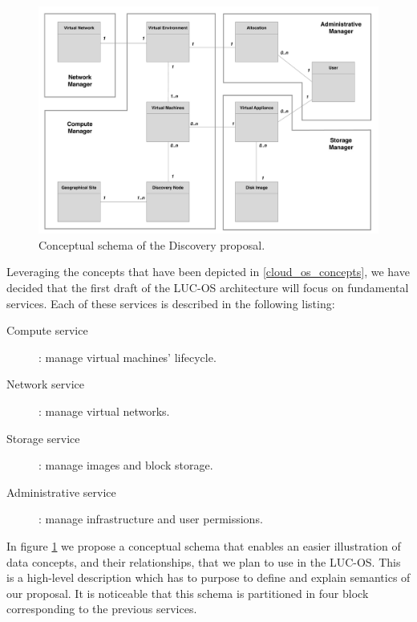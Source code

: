 
\begin{figure}
	\centering
	\includegraphics[width=0.91\linewidth]{Figures/mcd_3.pdf}
	\caption{Conceptual schema of the Discovery proposal.}%
	\label{fig:mcd}%
\end{figure}

Leveraging the concepts that have been depicted in \ref{cloud_os_concepts}, we 
have decided that the first draft of the LUC-OS architecture will focus on 
fundamental services. Each of these services is described in the following 
listing:

\begin{description}

	\item [Compute service] : manage virtual machines' lifecycle.

	\item [Network service] : manage virtual networks.

	\item [Storage service] : manage images and block storage.

	\item [Administrative service] : manage infrastructure and user permissions.  

\end{description}

In figure \ref{fig:mcd} we propose a conceptual schema that enables an easier 
illustration of data concepts, and their relationships, that we plan to use in
the LUC-OS. This is a high-level description which has to purpose to define and 
explain semantics of our proposal. It is noticeable that this schema is 
partitioned in four block corresponding to the previous services.

